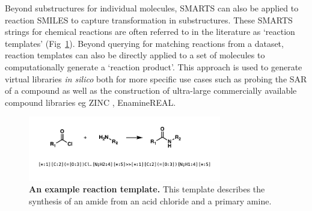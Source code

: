 Beyond substructures for individual molecules, SMARTS can also be applied to reaction SMILES to capture transformation in substructures. These SMARTS strings for chemical reactions are often referred to in the literature as `reaction templates' (Fig~\ref{fig:rx_template}). Beyond querying for matching reactions from a dataset, reaction templates can also be directly applied to a set of molecules to computationally generate a `reaction product'. This approach is used to generate virtual libraries \cite{Walters2019libraries, SaldivarGonzalez2020enumeration} \textit{in silico} both for more specific use cases such as probing the SAR of a compound as well as the construction of ultra-large commercially available compound libraries eg ZINC \cite{Irwin2020Zinc}, EnamineREAL.


\begin{figure}[htbp!] 
 \centering 
 \includegraphics[width=0.75\textwidth]{Chapters/Background/Figs/rx_template_new.png}
 \caption[Reaction template]{\textbf{An example reaction template.} This template describes the synthesis of an amide from an acid chloride and a primary amine.}
 \label{fig:rx_template}
\end{figure}

